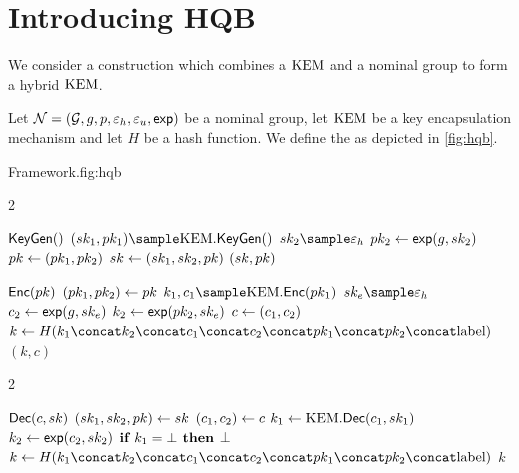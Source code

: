 \section{Introducing HQB}\label{sec:hqb}
%
We consider a construction which combines a $\text{KEM}$ and a nominal group to
form a hybrid $\text{KEM}$.
%
\begin{definition}[\hqb] \label{def:hqb}
    Let $\mathcal{N} = (\mathcal{G}, g, p, \varepsilon_h , \varepsilon_u , \textsf{exp})$ be a nominal group, let
    $\text{KEM}$ be a key encapsulation mechanism and let $H$ be a hash function.
    We define the \hqb \kem as depicted in \autoref{fig:hqb}.
    \begin{gamefigure}{\hqb Framework.}{fig:hqb}
        \begin{games}{2}
            \begin{gameenv}{\algor $\textsf{KeyGen}()$}
                \State $(\sk_1, \pk_1)  \sample \kem.\keygen()$
                \State $\sk_2 \sample \honestexponent$
                \State $pk_2 \leftarrow \textsf{exp}(g, sk_2)$
                \State $pk \leftarrow (pk_1, pk_2)$
                \State $sk \leftarrow (sk_1, sk_2, pk)$
                \State \Return $(sk, pk)$
            \end{gameenv}
            \columnbreak
            \begin{gameenv}{\algor $\textsf{Enc}(pk)$}
                \State $(pk_1, pk_2) \leftarrow pk$
                \State $k_1, c_1 \sample \kem.\enc(\pk_1)$
                \State $\sk_e \sample \honestexponent$
                \State $c_2 \leftarrow \textsf{exp}(g, sk_e)$
                \State $k_2 \leftarrow \textsf{exp}(pk_2, sk_e)$
                \State $c \leftarrow (c_1, c_2)$
                \State $k \assign H(k_1 \concat k_2 \concat c_1 \concat c_2 \concat \pk_1 \concat \pk_2 \concat \text{label})$
                \State \Return $(k, c)$
            \end{gameenv}
        \end{games}

        \begin{games}{2}
            \begin{gameenv}{\algor $\textsf{Dec}(c, sk)$}
                \State $(sk_1, sk_2, pk) \leftarrow sk$
                \State $(c_1, c_2) \leftarrow c$
                \State $k_1 \leftarrow \text{KEM}.\textsf{Dec}(c_1, sk_1)$
                \State $k_2 \leftarrow \textsf{exp}(c_2, sk_2)$
                \State $\textbf{if } k_1 = \bot \textbf{ then}$
                \State \quad \Return $\bot$
                \State $k \assign H(k_1 \concat k_2 \concat c_1 \concat c_2 \concat \pk_1 \concat \pk_2 \concat \text{label})$
                \State \Return $k$
                \end{gameenv}
                \gamebreak
                \emptygame
            \end{games}
        \end{gamefigure}

    \end{definition}

